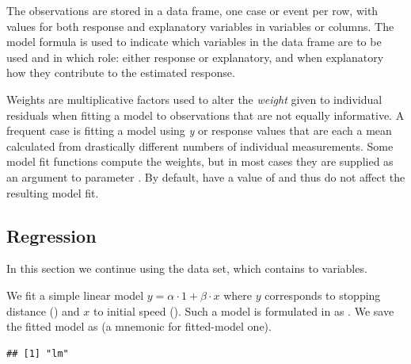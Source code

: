 \documentclass[krantz2]{krantz}\usepackage{knitr}
\begin{document}
The observations are stored in a data frame, one case or event per row, with values for both response and explanatory variables in variables or columns. The model formula is used to indicate which variables in the data frame are to be used and in which role: either
response or explanatory, and when explanatory how they contribute to the estimated response.

\begin{explainbox}
Weights are multiplicative factors used to alter the \emph{weight} given to individual residuals when fitting a model to observations that are not equally  informative. A frequent case is fitting a model using \emph{y} or response values that are each a mean calculated from drastically different numbers of individual measurements. Some model fit functions compute the weights, but in most cases they are supplied as an argument to parameter . By default,  have a value of  and thus do not affect the resulting model fit.
\end{explainbox}

\subsection{Regression}
In this section we continue using the  data set, which contains to  variables.

We fit a simple linear model $y = \alpha \cdot 1 + \beta \cdot x$ where $y$ corresponds to stopping distance () and $x$ to initial speed (). Such a model is formulated in \Rlang as . We save the fitted model as  (a mnemonic for fitted-model one).\label{chunk:lm:models1}

\begin{knitrout}\footnotesize
{}\color{fgcolor}\begin{kframe}
\begin{alltt}
 \hlkwb{<-}  \hlopt{~}  \hlopt{+}  
\end{alltt}
\begin{verbatim}
## [1] "lm"
\end{verbatim}
\end{kframe}
\end{knitrout}
\end{document}
